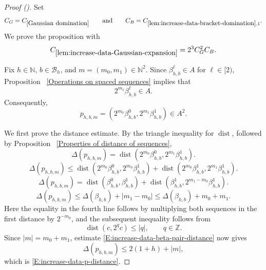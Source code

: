 \documentclass[12pt,reqno]{amsart}
\newcommand{\auto}{{({\tiny\faCar})}}
\theoremstyle{plain}
\numberwithin{equation}{section}
\theoremstyle{remark}
\DeclareMathOperator{\dist}{dist}
\begin{document}
\begin{proof}[Proof \auto]
Set
\[
C_G=C_{\ref{Gaussian domination}}
\qquad\text{and}\qquad
C_B=C_{\ref{lem:increase-data-bracket-domination},1}.
\]
We prove the proposition with
\begin{equation}
    \label{E:increase-data-Gaussian-expansion-constant}
    C_{\ref{lem:increase-data-Gaussian-expansion}}
    =
    2^3C_G^2C_B.
\end{equation}

Fix \(h\in\mathbb N\), \(b\in\mathcal B_h\), and
\(m=(m_0,m_1)\in\mathbb N^2\). Since
\(\beta_{h,b}^\ell\in A\) for \(\ell\in[2)\), Proposition~
\ref{Operations on spaced sequences} implies that
\[
2^{m_\ell}\beta_{h,b}^\ell\in A.
\]
Consequently,
\[
p_{h,b,m}
=
\left(
2^{m_0}\beta_{h,b}^0,
2^{m_1}\beta_{h,b}^1
\right)
\in A^2.
\]

We first prove the distance estimate. By the triangle inequality
for \(\dist\), followed by Proposition~
\ref{Properties of distance of sequences},
\[
\Delta(p_{h,b,m})
=
\dist\left(
2^{m_0}\beta_{h,b}^0,
2^{m_1}\beta_{h,b}^1
\right).
\]
\[
\Delta(p_{h,b,m})
\leq
\dist\left(
2^{m_0}\beta_{h,b}^0,
2^{m_0}\beta_{h,b}^1
\right)
+
\dist\left(
2^{m_0}\beta_{h,b}^1,
2^{m_1}\beta_{h,b}^1
\right).
\]
\[
\Delta(p_{h,b,m})
=
\dist\left(
\beta_{h,b}^0,
\beta_{h,b}^1
\right)
+
\dist\left(
\beta_{h,b}^1,
2^{m_1-m_0}\beta_{h,b}^1
\right).
\]
\[
\Delta(p_{h,b,m})
\leq
\Delta(\beta_{h,b})
+
|m_1-m_0|
\leq
\Delta(\beta_{h,b})
+
m_0+m_1.
\]
Here the equality in the fourth line follows by multiplying both
sequences in the first distance by \(2^{-m_0}\), and the subsequent
inequality follows from
\[
\dist(c,2^qc)\leq |q|,
\qquad q\in\mathbb Z.
\]
Since \(|m|=m_0+m_1\), estimate
\eqref{E:increase-data-beta-pair-distance} now gives
\[
\Delta(p_{h,b,m})
\leq
2(1+h)
+
|m|,
\]
which is \eqref{E:increase-data-p-distance}.


\end{proof}
\end{document}
